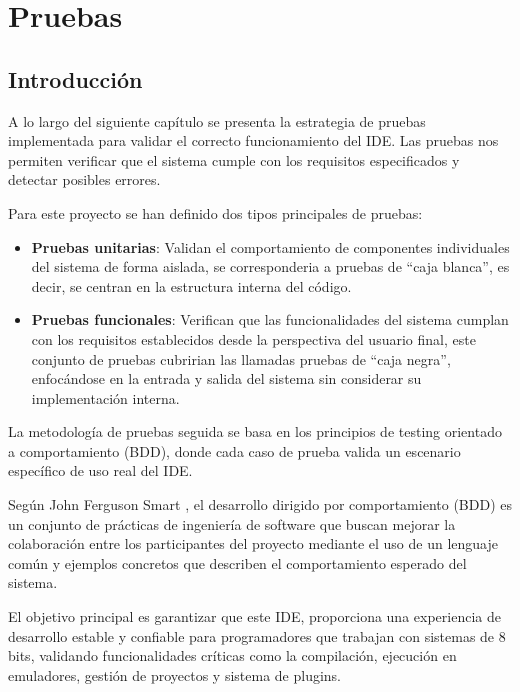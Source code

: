 \documentclass[../../main.tex]{subfiles}
\begin{document}
\chapter{Pruebas}
\label{C:pruebas}

\section{Introducción}

A lo largo del siguiente capítulo se presenta la estrategia de pruebas implementada para validar el correcto funcionamiento del IDE. Las pruebas nos permiten verificar que el sistema cumple con los requisitos especificados y detectar posibles errores.

Para este proyecto se han definido dos tipos principales de pruebas:

\begin{itemize}
\item \textbf{Pruebas unitarias}: Validan el comportamiento de componentes individuales del sistema de forma aislada, se corresponderia a pruebas de ``caja blanca'', es decir, se centran en la estructura interna del código.
\item \textbf{Pruebas funcionales}: Verifican que las funcionalidades del sistema cumplan con los requisitos establecidos desde la perspectiva del usuario final, este conjunto de pruebas cubririan las llamadas pruebas de ``caja negra'', enfocándose en la entrada y salida del sistema sin considerar su implementación interna.
\end{itemize}

La metodología de pruebas seguida se basa en los principios de testing orientado a comportamiento (BDD), donde cada caso de prueba valida un escenario específico de uso real del IDE. 
 
Según John Ferguson Smart \cite{smart2014bdd}, el desarrollo dirigido por comportamiento (BDD) es un conjunto de prácticas de ingeniería de software que buscan mejorar la colaboración entre los participantes del proyecto mediante el uso de un lenguaje común y ejemplos concretos que describen el comportamiento esperado del sistema.

El objetivo principal es garantizar que este IDE, proporciona una experiencia de desarrollo estable y confiable para programadores que trabajan con sistemas de 8 bits, validando funcionalidades críticas como la compilación, ejecución en emuladores, gestión de proyectos y sistema de plugins.

\clearpage
\end{document}
